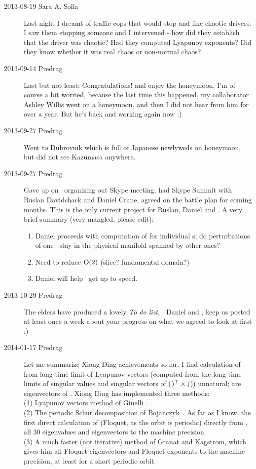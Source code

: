 \begin{description}
\item[2013-08-19 Sara A. Solla] Last night I dreamt of traffic cops
that would stop and fine chaotic drivers. I saw them stopping someone
and I intervened - how did they establish that the driver was
chaotic? Had they computed Lyapunov exponents? Did they know whether
it was real chaos or non-normal chaos?


\item[2013-09-14 Predrag]
Last but not least: Congratulations! and enjoy the honeymoon. I'm of
course a bit worried, because the last time this happened, my
collaborator Ashley Willis went on a honeymoon, and then I did not
hear from him for over a year. But he's back and working again now :)

\item[2013-09-27 Predrag] Went to Dubrovnik which is full of Japanese
    newlyweds on honeymoon, but did not see Kazumasa anywhere.

\item[2013-09-27 Predrag] Gave up on \XD\ organizing out Skype
meeting, had Skype Summit with Ruslan Davidchack and
Daniel Crane, agreed on the battle plan for coming months. This is
the only current project for Ruslan, Daniel and \XD. A very brief
summary (very mangled, please edit):

\begin{enumerate}
  \item Daniel proceeds with computation of {\cLvs} for individual
      \rpo s; do perturbations of one \rpo\ stay in the physical
      manifold spanned by other ones?
  \item Need to reduce $\textrm{O}(2)$ (slice? fundamental domain?)
  \item Daniel will help \XD\ get up to speed.
\end{enumerate}

\item[2013-10-29 Predrag] The elders have produced a lovely
{\em To do list},
. Daniel and \XD, keep us posted at least once
a week about your progress on what we agreed to look at first :)

\item[2014-01-17 Predrag] Let me summarize Xiong Ding achievements so far.
I find calculation of {\cLvs} from long time limit of
Lyapunov vectors (computed from
the long time limits of
singular values and singular vectors
of (\jacobianM${)}{}^\top\times($\jacobianM)) unnatural; {\cLvs} are eigenvectors of \jacobianM.
Xiong Ding has implemented three methods:
\\
(1) Lyapunov vectors method of Ginelli \etal{}.
\\
(2) The periodic Schur decomposition of
Bojanczyk~\etal{}.
As far as I know, the first direct calculation of {\cLvs} (Floquet,
as the orbit is periodic) directly from \jacobianM, all 30
eigenvalues and eigenvectors to the machine precision.
\\
(3) A much faster (not iterative) method of Granat and
Kagstrom, which gives him all Floquet eigenvectors and
Floquet exponents to the machine precision, at least for a short periodic
orbit.


\end{description}
